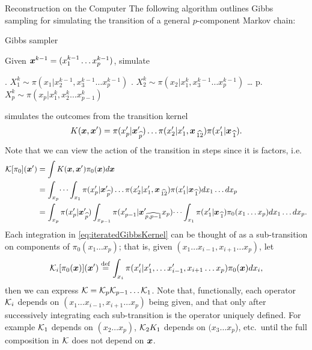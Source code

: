 \begin{chapter}{Reconstruction on the Computer}
The following algorithm outlines Gibbs sampling for simulating the transition of a general $p$-component Markov chain:
\begin{algorithm}
\caption{Gibbs sampler} \label{alg:gibbs}
  Given $\mbox{\boldmath$x$}^{k-1} = (x_1^{k-1}\dots x_p^{k-1})$, simulate
\begin{algorithmic}[0]
  . $X_1^{k} \sim \pi(x_1|x_2^{k-1},x_3^{k-1}\dots x_p^{k-1})$
  . $X_2^{k} \sim \pi(x_2|x_1^k,x_3^{k-1}\dots x_p^{k-1})$ 
  \STATE \dots
  \STATE p. $X_p^{k} \sim \pi(x_p|x_1^k,x_2^{k}\dots x_{p-1}^{k})$
\end{algorithmic}
\end{algorithm}

 simulates the outcomes from the transition kernel 
\begin{equation}
  K(\mbox{\boldmath$x$},\mbox{\boldmath$x$}') = \pi(x_p'|\mbox{\boldmath$x$}_{\,\widehat{p}}')\dots\pi(x_2'|x_1',\mbox{\boldmath$x$}_{\,\widehat{12}})\pi(x_1'|\mbox{\boldmath$x$}_{\,\widehat{1}}).
\end{equation}
Note that we can view the action of the transition in steps since it is factors, i.e.
\begin{align}
  \mathcal K [\pi_0](\mbox{\boldmath$x$}') 
    &= \int K(\mbox{\boldmath$x$},\mbox{\boldmath$x$}') \pi_0(\mbox{\boldmath$x$}) d\mbox{\boldmath$x$} \nonumber \\
    &= \int_{x_p}\dots\int_{x_1} \pi(x_p'|\mbox{\boldmath$x$}_{\,\widehat{p}}')\dots\pi(x_2'|x_1',\mbox{\boldmath$x$}_{\,\widehat{12}})\pi(x_1'|\mbox{\boldmath$x$}_{\,\widehat{1}})dx_1\dots dx_p \nonumber\\ 
    &= \int_{x_p}\pi(x_p'|\mbox{\boldmath$x$}_{\,\widehat{p}}')\int_{x_{p-1}} \pi(x_{p-1}'|\mbox{\boldmath$x$}_{\,\widehat{p,p-1}}'x_p)\dots\int_{x_1} \pi(x_1'|\mbox{\boldmath$x$}_{\,\widehat{1}}) \pi_0(x_1\dots x_p)dx_1\dots dx_p. \label{eq:iteratedGibbsKernel}
\end{align}
Each integration in \eqref{eq:iteratedGibbsKernel} can be thought of as a sub-transition on components of $\pi_0(x_1\dots x_p)$; that is, given $(x_1\dots x_{i-1},x_{i+1}\dots x_p)$, let
\begin{equation}
  \mathcal K_i[\pi_0(\mbox{\boldmath$x$})](\mbox{\boldmath$x$}') \stackrel{\rm def}{=} \int_{x_i} \pi(x_i'|x_1',\dots x_{i-1}',x_{i+1}\dots x_p) \pi_0(\mbox{\boldmath$x$})dx_i,
\end{equation}
then we can express $\mathcal K = \mathcal K_p\mathcal K_{p-1} \dots \mathcal K_1$.
Note that, functionally, each operator $\mathcal K_i$ depends on $(x_1\dots x_{i-1},x_{i+1}\dots x_p)$ being given, and that only after successively integrating each sub-transition is the operator uniquely defined.
For example $\mathcal K_1$ depends on $(x_2\dots x_p)$, $\mathcal K_2 K_1$ depends on $(x_3\dots x_p$), etc.~until the full composition in $\mathcal K$ does not depend on $\mbox{\boldmath$x$}$.


\end{chapter}
